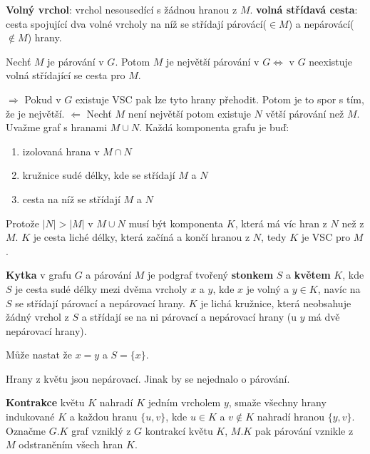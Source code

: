 \begin{definice}
	\textbf{Volný vrchol}: vrchol nesousedící s žádnou hranou z $M$. \textbf{volná střídavá cesta}: cesta spojující dva volné vrcholy na níž se střídají párovácí($\in M$) a nepárovácí($\notin M$) hrany.	
\end{definice}

\begin{lemma}
	Nechť $M$ je párování v $G$. Potom $M$ je největší párování v $G \Leftrightarrow$ v $G$ neexistuje volná střídající se cesta pro $M$.
\end{lemma}

\begin{dukaz}
	$\Rightarrow$ Pokud v $G$ existuje VSC pak lze tyto hrany přehodit. Potom je to spor s tím, že je největší. $\Leftarrow$ Nechť $M$ není největší potom existuje $N$ větší párování než $M$. Uvažme graf s hranami $M \cup N$. Každá komponenta grafu je buď:
	
	\begin{enumerate}
		\item izolovaná hrana v $M \cap N$
		\item kružnice sudé délky, kde se střídají $M$ a $N$
		\item cesta na níž se střídají $M$ a $N$
	\end{enumerate}
	
	Protože $|N| > |M|$ v $M \cup N$ musí být komponenta $K$, která má víc hran z $N$ než z $M$. $K$ je cesta liché délky, která začíná a končí hranou z $N$, tedy $K$ je VSC pro $M$.
\end{dukaz}

\begin{definice}
	\textbf{Kytka} v grafu $G$ a párování $M$ je podgraf tvořený \textbf{stonkem} $S$ a \textbf{květem} $K$, kde $S$ je cesta sudé délky mezi dvěma vrcholy $x$ a $y$, kde $x$ je volný a $y \in K$, navíc na $S$ se střídají párovací a nepárovací hrany. $K$ je lichá kružnice, která neobsahuje žádný vrchol z $S$ a střídají se na ni párovací a nepárovací hrany (u $y$ má dvě nepárovací hrany).
\end{definice}

Může nastat že $x=y$ a $S=\{x\}$.

\begin{pozor}
	Hrany z květu jsou nepárovací. Jinak by se nejednalo o párování.
\end{pozor}

\begin{definice}
	\textbf{Kontrakce} květu $K$ nahradí $K$ jedním vrcholem $y$, smaže všechny hrany indukované $K$ a každou hranu $\{u,v\}$, kde $u \in K$ a $v \notin K$ nahradí hranou $\{y,v\}$. Označme $G.K$ graf vzniklý z $G$ kontrakcí květu $K$, $M.K$ pak párování vznikle z $M$ odstraněním všech hran $K$.
\end{definice}

